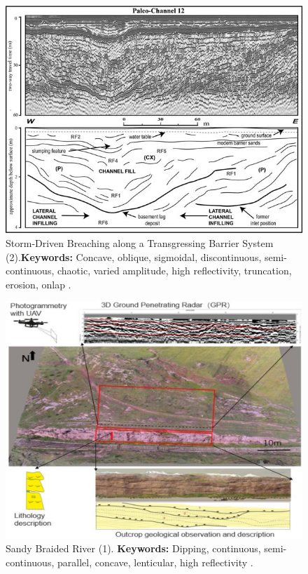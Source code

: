 \begin{figure}[h!]
    \centering
    \includegraphics[width=0.9\linewidth]{Figures/0.2GPR/Maio2015_channelfill_2.png}
    \caption[Storm-Driven Breaching along a Transgressing Barrier System (2).]{Storm-Driven Breaching along a Transgressing Barrier System (2).\textbf{Keywords: } Concave, oblique, sigmoidal, discontinuous, semi-continuous, chaotic, varied amplitude, high reflectivity, truncation, erosion, onlap \citep{Maio2016}.}
    \label{fig:Maio2016-2}
\end{figure}


\begin{figure}[h!]
    \centering
    \includegraphics[width=0.9\linewidth]{Figures/0.2GPR/Guo2022_1.png}
    \caption[Sandy Braided River (1).]{Sandy Braided River (1). \textbf{Keywords: } Dipping, continuous, semi-continuous, parallel, concave, lenticular, high reflectivity \citep{Guo2022}.}
    \label{fig:Guo2022-1}
\end{figure}


